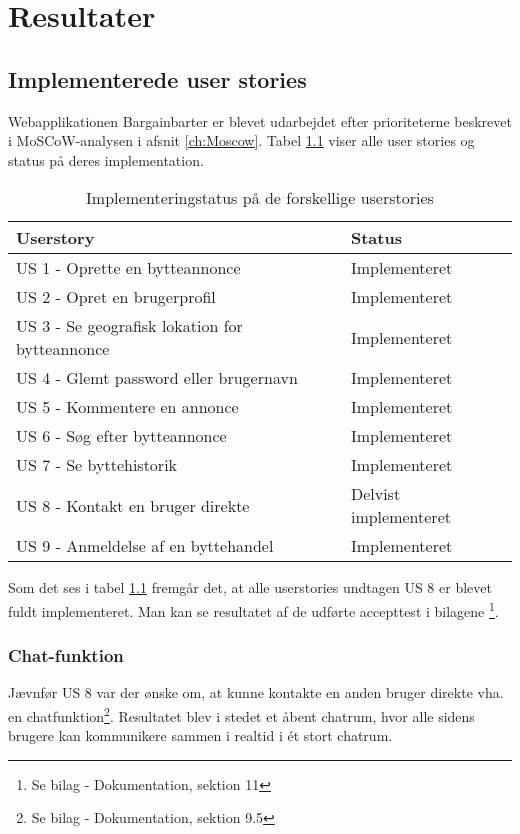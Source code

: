 \chapter{Resultater}\label{ch:Resultat og Diskussion}
\section{Implementerede user stories}
Webapplikationen Bargainbarter er blevet udarbejdet efter prioriteterne beskrevet i MoSCoW-analysen i afsnit \ref{ch:Moscow}. Tabel \ref{fig:Implementeringsstatus} viser alle user stories og status på deres implementation.

\begin{table}[H]
	\begin{tabular}{ | l | p{5cm} |}
		\hline
		\textbf{Userstory}  & \textbf{Status} \\ \hline
		US 1 - Oprette en bytteannonce  & Implementeret \\ \hline
		US 2 - Opret en brugerprofil & Implementeret \\ \hline
		US 3 - Se geografisk lokation for bytteannonce & Implementeret \\ \hline
		US 4 - Glemt password eller brugernavn & Implementeret \\ \hline
		US 5 - Kommentere en annonce & Implementeret \\ \hline
		US 6 - Søg efter bytteannonce & Implementeret \\ \hline
		US 7 - Se byttehistorik & Implementeret \\ \hline	
		US 8 - Kontakt en bruger direkte & Delvist implementeret \\ \hline	
		US 9 - Anmeldelse af en byttehandel & Implementeret \\ \hline	
	\end{tabular}
\caption{Implementeringstatus på de forskellige userstories}
\label{fig:Implementeringsstatus}
\end{table}

\noindent Som det ses i tabel \ref{fig:Implementeringsstatus} fremgår det, at alle userstories undtagen  US 8 er blevet fuldt implementeret. Man kan se resultatet af de udførte accepttest i bilagene \footnote{Se bilag - Dokumentation, sektion 11}.

\subsection{Chat-funktion}
Jævnfør US 8 var der ønske om, at kunne kontakte en anden bruger direkte vha. en chatfunktion\footnote{Se bilag - Dokumentation, sektion 9.5}. Resultatet blev i stedet et åbent chatrum, hvor alle sidens brugere kan kommunikere sammen i realtid i ét stort chatrum. 

